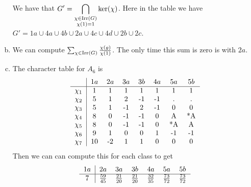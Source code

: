 \documentclass[leqno]{article}
\begin{document}
\begin{solution}
\begin{enumerate}[(a)]
    We have that $\displaystyle{G'=\bigcap_{\substack{{\chi \in \mathrm{Irr}(G)}\\{\chi(1)=1}}} \ker(\chi)}$. Here in the table we have $G'=1a\cup 4a\cup 4b \cup 2a \cup 4c \cup 4d \cup 2b \cup 2c$.
    \item We can compute $\sum_{\chi \in \mathrm{Irr}(G)}\frac{\chi(g)}{\chi(1)}$.  The only time this sum is zero is with $2a$.
    \item The character table for $A_6$ is
    \[
    \begin{tabular}{c|ccccccc}
        ~  & $1a$ & $2a$ & $3a$ & $3b$ & $4a$ & $5a$ & $5b$\\
        \hline
        $\chi_1$ & 1 & 1 & 1 & 1 & 1 & 1 & 1 \\
        $\chi_2$ & 5 & 1 & 2 & -1 & -1 & . & .\\
        $\chi_3$ & 5 & 1 & -1 & 2 & -1 & 0 & 0\\
        $\chi_4$ & 8 & 0 & -1 & -1 & 0 & A & *A\\
        $\chi_5$ & 8 & 0 & -1 & -1 & 0 & *A & A\\
        $\chi_6$ & 9 & 1 & 0 & 0 & 1 & -1 & -1 \\
        $\chi_7$ & 10 & -2 & 1 & 1 & 0 & 0 & 0
    \end{tabular}
    \]
    Then we can can compute this for each class to get
    \[
    \begin{tabular}{c|ccccccc}
        $1a$ & $2a$ & $3a$ & $3b$ & $4a$ & $5a$ & $5b$  \\
        \hline
        7 & $\frac{59}{45}$ & $\frac{21}{20}$ & $\frac{21}{20}$ & $\frac{32}{35}$ & $\frac{73}{72}$ & $\frac{73}{72}$
    \end{tabular}
    \]
\end{enumerate}
\end{solution}
\end{document}
